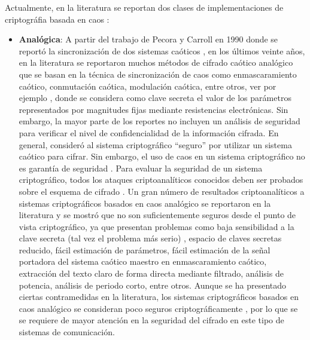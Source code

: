 Actualmente, en la literatura se reportan dos clases de implementaciones de criptográfia basada en caos \cite{LEtAl_2007, AyL_2006}:
\begin{itemize}
\item \textbf{Analógica}: A partir del trabajo de Pecora y Carroll en 1990 donde se reportó la sincronización de dos sistemas caóticos \cite{PyC_1990}, en los últimos veinte años, en la literatura se reportaron muchos métodos de cifrado caótico analógico que se basan en la técnica de sincronización de caos como enmascaramiento caótico, conmutación caótica, modulación caótica, entre otros, ver por ejemplo \cite{CEtAl_1992, CyO_1992, CyO_1993, CEtAl_1993, MyZ_1996, GEtAl_2000, C_2004, PEtAl_2004, LyC_2004, LyC_2005, CEtAl_2005, LEtAl_2005, CyR_2006, PEtAl_2007, AEtAl_2008a, LEtAl_2009a, LEtAl_2009b, GEtAl_2009, SEtAl_2010a, CEtAl_2012, AEtAl_2012b}, donde se considera como clave secreta el valor de los parámetros representados por magnitudes fijas mediante resistencias electrónicas. Sin embargo, la mayor parte de los reportes no incluyen un análisis de seguridad para verificar el nivel de confidencialidad de la información cifrada. En general, consideró al sistema criptográfico ``seguro'' por utilizar un sistema caótico para cifrar. Sin embargo, el uso de caos en un sistema criptográfico no es garantía de seguridad \cite{K_2001}. Para evaluar la seguridad de un sistema criptográfico, todos los ataques criptoanalíticos conocidos deben ser probados sobre el esquema de cifrado \cite{LEtAl_2007}. Un gran número de resultados criptoanalíticos a sistemas criptográficos basados en caos analógico se reportaron en la literatura y se mostró que no son suficientemente seguros desde el punto de vista criptográfico, ya que presentan problemas como baja sensibilidad a la clave secreta (tal vez el problema más serio) \cite{WEtAl_2004a}, espacio de claves secretas reducido, fácil estimación de parámetros, fácil estimación de la señal portadora del sistema caótico maestro en enmascaramiento caótico, extracción del texto claro de forma directa mediante filtrado, análisis de potencia, análisis de periodo corto, entre otros. Aunque se ha presentado ciertas contramedidas en la literatura, los sistemas criptográficos basados en caos analógico se consideran poco seguros criptográficamente \cite{LEtAl_2007}, por lo que se se requiere de mayor atención en la seguridad del cifrado en este tipo de sistemas de comunicación.   

\end{itemize}
